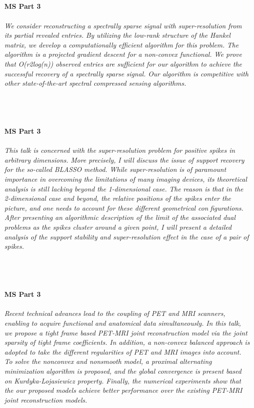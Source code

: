 \begin{multicols}{2}
\\ 
    \\
    \\\\
    \noindent\textbf{MS Part 3}\\
\\  
    \textit{We consider reconstructing a spectrally sparse signal with super-resolution from its partial revealed entries. By utilizing the low-rank structure of the Hankel matrix, we develop a computationally efficient algorithm for this problem. The algorithm is a projected gradient descent for a non-convex functional. We prove that O(r2log(n)) observed entries are sufficient for our algorithm to achieve the successful recovery of a spectrally sparse signal. Our algorithm is competitive with other state-of-the-art spectral compressed sensing algorithms.}\\
\\ 
    \\
    \\\\
    \noindent\textbf{MS Part 3}\\
\\  
    \textit{This talk is concerned with the super-resolution problem for positive spikes in arbitrary dimensions. More precisely, I will discuss the issue of support recovery for the so-called BLASSO method. While super-resolution is of paramount importance in overcoming the limitations of many imaging devices, its theoretical analysis is still lacking beyond the 1-dimensional case. The reason is that in the 2-dimensional case and beyond, the relative positions of the spikes enter the picture, and one needs to account for these different geometrical configurations. After presenting an algorithmic description of the limit of the associated dual problems as the spikes cluster around a given point, I will present a detailed analysis of the support stability and super-resolution effect in the case of a pair of spikes.}\\
\\ 
    \\
    \\\\
    \noindent\textbf{MS Part 3}\\
\\  
    \textit{Recent technical advances lead to the coupling of PET and MRI scanners, enabling to acquire functional and anatomical data simultaneously. In this talk, we propose a tight frame based PET-MRI joint reconstruction model via the joint sparsity of tight frame coefficients. In addition, a non-convex balanced approach is adopted to take the different regularities of PET and MRI images into account. To solve the nonconvex and nonsmooth model, a proximal alternating minimization algorithm is proposed, and the global convergence is present based on Kurdyka-Lojasiewicz property. Finally, the numerical experiments show that the our proposed models achieve better performance over the existing PET-MRI joint reconstruction models.}\\

\end{multicols}
